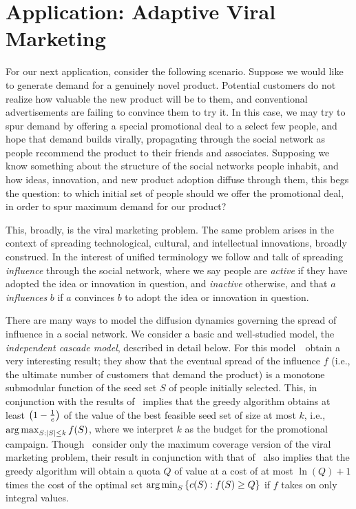%
\section{Application: Adaptive Viral Marketing} \label{sec:viral-marketing}

For our next application, consider the following scenario.  
Suppose we would like to generate demand for a genuinely novel 
product.  Potential customers do not realize how valuable the new
product will be to them, and conventional advertisements are
failing to convince them to try it.
In this case, we may try to spur demand by offering a special
promotional deal to a 
select few people, and 
hope that demand builds virally, propagating through the social
network as people recommend the product to their friends and
associates.
Supposing we know something about the structure of the
social networks people inhabit, and how ideas, innovation, and new
product adoption diffuse through them, this begs the
question: to which initial set of people should we offer the
promotional deal, in order to spur maximum demand for our product?

 This, broadly, is the viral marketing problem.  
The same problem arises in the context of spreading technological, 
cultural, and intellectual innovations, broadly construed.  In the
interest of unified terminology we 
follow \citet{kempe03} and 
talk of spreading \emph{influence} through the social network, where
we say people are \emph{active} if they have adopted the idea or
innovation in question, and \emph{inactive} otherwise, and that $a$ \emph{influences} $b$ if $a$
convinces $b$ to adopt the idea or innovation in question.

There are many ways to model the diffusion dynamics governing the
spread of influence in a social network.  We consider a basic and
well-studied model, the \emph{independent
  cascade model}, described in detail below. 
For this model~\citet{kempe03}~obtain a very interesting result;
they show that the eventual spread of the influence ${f}$ (i.e., the
ultimate number of customers that demand the product) is a monotone
submodular function of the seed set $S$ of people initially selected.  This, in
conjunction with the results of~\citet{nemhauser78} implies that the
 greedy algorithm 
obtains at least $ \left( {1 - \frac1e} \right) $ of the value of the best
feasible seed set of size at most $k$, i.e., $\mathop{\rm arg\,max}_{S: |S| \le k} {f}(S)$,
where we interpret $k$ as the budget for the promotional campaign.
Though~\citeauthor{kempe03} consider only the maximum coverage version of
the viral marketing problem, their result  
in conjunction with that of~\citet{wolsey82} also implies that
the greedy algorithm will obtain a quota $Q$ of value at a cost of 
at most $\ln(Q)+1$ times the cost of the optimal set 
$\mathop{\rm arg\,min}_{S} \left\{c(S) : f(S) \ge Q\right\}$ if $f$ takes on only integral
values. 

